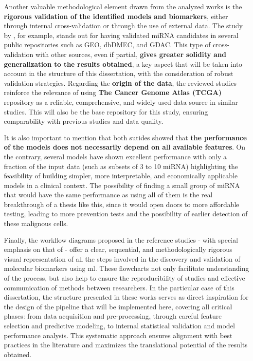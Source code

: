 Another valuable methodological element drawn from the analyzed works is the
\textbf{rigorous validation of the identified models and biomarkers}, either
through internal cross-validation or through the use of external data. The
study by \textcite{ml_gastric_Azari2023}, for example, stands out for having
validated miRNA candidates in several public repositories such as GEO, dbDMEC,
and GDAC. This type of cross-validation with other sources, even if partial,
\textbf{gives greater solidity and generalization to the results obtained}, a
key aspect that will be taken into account in the structure of this
dissertation, with the consideration of robust validation strategies. Regarding
the \textbf{origin of the data}, the reviewed studies reinforce the relevance
of using \textbf{The Cancer Genome Atlas (TCGA)} repository as a reliable,
comprehensive, and widely used data source in similar studies. This will also
be the base repository for this study, ensuring comparability with previous
studies and data quality.

It is also important to mention that both sutides showed that \textbf{the
  performance of the models does not necessarily depend on all available
  features}. On the contrary, several models have shown excellent performance
with only a fraction of the input data (such as subsets of 3 to 10 miRNA)
highlighting the feasibility of building simpler, more interpretable, and
economically applicable models in a clinical context. The possibility of
finding a small group of miRNA that would have the same performance as
using all of them is the real breakthrough of a thesis like this, since it
would open doors to more affordable testing, leading to more prevention tests
and the possibility of earlier detection of these malignous cells.

Finally, the workflow diagrams proposed in the reference studies - with special
emphasis on that of \textcite{ml_gastric_Azari2023} - offer a clear,
sequential, and methodologically rigorous visual representation of all the
steps involved in the discovery and validation of molecular biomarkers using
\gls{ml}. These flowcharts not only facilitate understanding of the process,
but also help to ensure the reproducibility of studies and effective
communication of methods between researchers. In the particular case of this
dissertation, the structure presented in these works serves as direct
inspiration for the design of the pipeline that will be implemented here,
covering all critical phases: from data acquisition and pre-processing, through
careful feature selection and predictive modeling, to internal statistical
validation and model performance analysis. This systematic approach ensures
alignment with best practices in the literature and maximizes the translational
potential of the results obtained.

